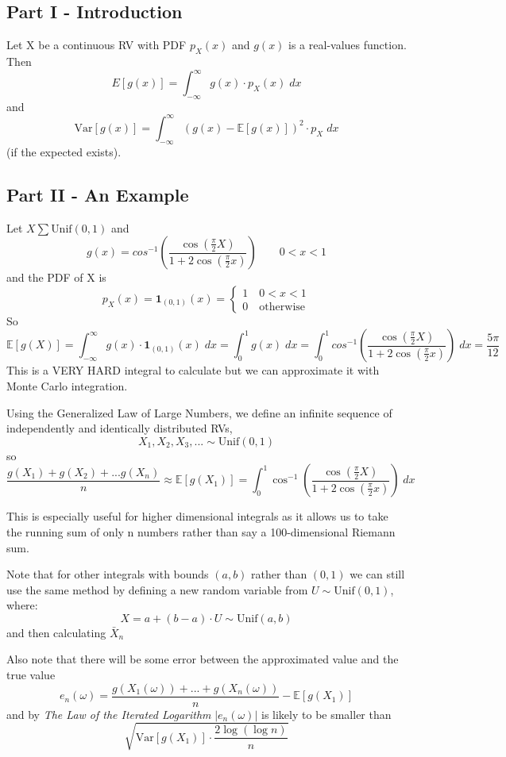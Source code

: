 \documentclass[12pt]{article}
\newcommand{\E}{\mathbb{E}}
\begin{document}
\subsection*{Part I - Introduction}
Let X be a continuous RV with PDF $p_X(x)$ and $g(x)$ is a real-values function. 
Then 
\[E[g(x)] = \int_{-\infty}^{\infty} g(x) \cdot p_X(x)\; dx\] 
and 
\[\text{Var}[g(x)] = \int_{-\infty}^{\infty} (g(x) - \E[g(x)])^2 \cdot p_X \; dx\]
(if the expected exists). 

\subsection*{Part II - An Example}
Let $X \sum \text{Unif}(0, 1)$ and 
\[g(x) = cos^{-1}\left(\frac{\cos(\frac{\pi}{2}X)}{1 + 2\cos(\frac{\pi}{2}x)}\right)\qquad 0 < x < 1\] 
and the PDF of X is 
\[p_X(x) = \mathbf{1}_{(0, 1)}(x) = \begin{cases}
    1 \quad 0 < x < 1\\
    0 \quad \text{otherwise}
\end{cases}\]
So 
\[\E[g(X)] = \int_{-\infty}^{\infty} g(x)\cdot \mathbf{1}_{(0, 1)}(x) \;dx= \int_0^1g(x)\; dx = \int_0^1 cos^{-1}\left(\frac{\cos(\frac{\pi}{2}X)}{1 + 2\cos(\frac{\pi}{2}x)}\right)\; dx = \frac{5\pi}{12}\]
This is a VERY HARD integral to calculate but we can approximate it with Monte Carlo integration. 

Using the Generalized Law of Large Numbers, we define an infinite sequence of independently and identically distributed RVs,
\[X_1, X_2, X_3, ... \sim \text{Unif}(0, 1)\]
so 
\[\frac{g(X_1) + g(X_2) + ... g(X_n)}{n} \approx \E[g(X_1)] = \int_0^1 \cos^{-1}\left(\frac{\cos(\frac{\pi}{2}X)}{1 + 2\cos(\frac{\pi}{2}x)}\right)\; dx\]

This is especially useful for higher dimensional integrals as it allows us to take the running sum of only n numbers rather than say a 100-dimensional Riemann sum. 

Note that for other integrals with bounds $(a, b)$ rather than $(0, 1)$ we can still use the same method by defining a new random variable from $U \sim\text{Unif}(0, 1)$, where:
\[X = a + (b- a)\cdot U \sim \text{Unif}(a, b)\]
and then calculating $\bar{X}_n$

Also note that there will be some error between the approximated value and the true value 
\[e_n(\omega) = \frac{g(X_1(\omega)) + ... + g(X_n(\omega))}{n} - \E[g(X_1)]\]
and by \emph{The Law of the Iterated Logarithm} $|e_n(\omega)|$ is likely to be smaller than 
\[\sqrt{\text{Var}[g(X_1)] \cdot \frac{2\log (\log n)}{n}}\]
\end{document}

